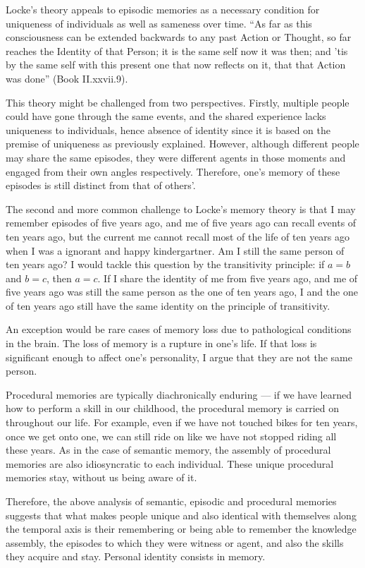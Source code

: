 \documentclass[a4paper,english,12pt]{scrartcl}
\begin{document}
Locke's theory appeals to episodic memories as a necessary condition
for uniqueness of individuals as well as sameness over time. ``As
far as this consciousness can be extended backwards to any past Action
or Thought, so far reaches the Identity of that Person; it is the
same self now it was then; and 'tis by the same self with this present
one that now reflects on it, that that Action was done'' (Book II.xxvii.9).

This theory might be challenged from two perspectives. Firstly, multiple
people could have gone through the same events, and the shared experience
lacks uniqueness to individuals, hence absence of identity since it
is based on the premise of uniqueness as previously explained. However,
although different people may share the same episodes, they were different
agents in those moments and engaged from their own angles respectively.
Therefore, one's memory of these episodes is still distinct from that
of others'.

The second and more common challenge to Locke's memory theory is that
I may remember episodes of five years ago, and me of five years ago
can recall events of ten years ago, but the current me cannot recall
most of the life of ten years ago when I was a ignorant and happy
kindergartner. Am I still the same person of ten years ago? I would
tackle this question by the transitivity principle: if $a=b$ and
$b=c$, then $a=c$. If I share the identity of me from five years
ago, and me of five years ago was still the same person as the one
of ten years ago, I and the one of ten years ago still have the same
identity on the principle of transitivity.

An exception would be rare cases of memory loss due to pathological
conditions in the brain. The loss of memory is a rupture in one's
life. If that loss is significant enough to affect one's personality,
I argue that they are not the same person.

Procedural memories are typically diachronically enduring --- if
we have learned how to perform a skill in our childhood, the procedural
memory is carried on throughout our life. For example, even if we
have not touched bikes for ten years, once we get onto one, we can
still ride on like we have not stopped riding all these years. As
in the case of semantic memory, the assembly of procedural memories
are also idiosyncratic to each individual. These unique procedural
memories stay, without us being aware of it.

Therefore, the above analysis of semantic, episodic and procedural
memories suggests that what makes people unique and also identical
with themselves along the temporal axis is their remembering or being
able to remember the knowledge assembly, the episodes to which they
were witness or agent, and also the skills they acquire and stay.
Personal identity consists in memory.
\end{document}
